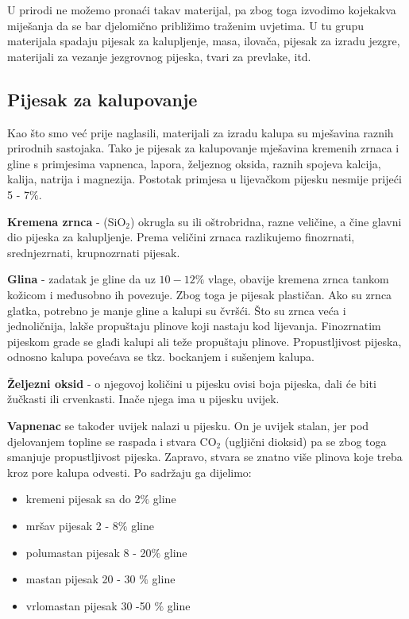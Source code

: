 \documentclass[a4paper,12pt]{article}
\numberwithin{figure}{section}
\begin{document}
U prirodi ne možemo pronaći takav materijal, pa zbog toga izvodimo kojekakva miješanja da se bar djelomično približimo traženim uvjetima. U tu grupu materijala spadaju pijesak za kalupljenje, masa, ilovača, pijesak za izradu jezgre, materijali za vezanje jezgrovnog pijeska, tvari za prevlake, itd.
\subsection{Pijesak za kalupovanje}
Kao što smo već prije naglasili, materijali za izradu kalupa su mješavina raznih prirodnih sastojaka. Tako je pijesak za kalupovanje mješavina kremenih zrnaca i gline s primjesima vapnenca, lapora, željeznog oksida, raznih spojeva kalcija, kalija, natrija i magnezija. Postotak primjesa u lijevačkom pijesku nesmije prijeći 5 - 7$\%$.\par
\textbf{Kremena zrnca} - (SiO$_{2}$) okrugla su ili oštrobridna, razne veličine, a čine glavni dio pijeska za kalupljenje. Prema veličini zrnaca razlikujemo finozrnati, srednjezrnati, krupnozrnati pijesak.\par
\textbf{Glina} - zadatak je gline da uz $10 - 12\%$ vlage, obavije kremena zrnca tankom kožicom i međusobno ih povezuje. Zbog toga je pijesak plastičan. Ako su zrnca glatka, potrebno je manje gline a kalupi su čvršći. Što su zrnca veća i jednoličnija, lakše propuštaju plinove koji nastaju kod lijevanja. Finozrnatim pijeskom grade se glađi kalupi ali teže propuštaju plinove. Propustljivost pijeska, odnosno kalupa povećava se tkz. bockanjem i sušenjem kalupa.\par
\textbf{Željezni oksid} - o njegovoj količini u pijesku ovisi boja pijeska, dali će biti žučkasti ili crvenkasti. Inače njega ima u pijesku uvijek. \par 
\textbf{Vapnenac} se također uvijek nalazi u pijesku. On je uvijek stalan, jer pod djelovanjem topline se raspada i stvara CO$_{2}$ (ugljični dioksid) pa se zbog toga smanjuje propustljivost pijeska. Zapravo, stvara se znatno više plinova koje treba kroz pore kalupa odvesti. Po sadržaju ga dijelimo:
\begin{itemize}
\item kremeni pijesak sa do 2$\%$ gline
\item mršav pijesak 2 - 8$\%$ gline
\item polumastan pijesak 8 - 20$\%$ gline
\item mastan pijesak 20 - 30 $\%$ gline
\item vrlomastan pijesak 30 -50 $\%$ gline
\end{itemize}
\end{document}
